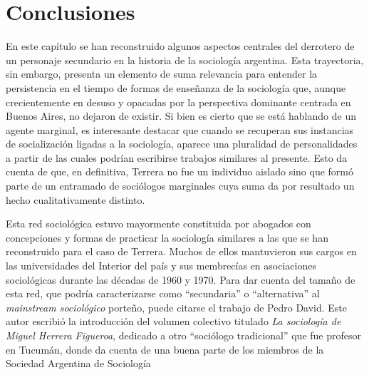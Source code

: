\section{Conclusiones}

En este capítulo se han reconstruido algunos aspectos centrales del derrotero de un personaje secundario en la historia de la sociología argentina. Esta trayectoria, sin embargo, presenta un elemento de suma relevancia para entender la persistencia en el tiempo de formas de enseñanza de la sociología que, aunque crecientemente en desuso y opacadas por la perspectiva dominante centrada en Buenos Aires, no dejaron de existir. Si bien es cierto que se está hablando de un agente marginal, es interesante destacar que cuando se recuperan sus instancias de socialización ligadas a la sociología, aparece una pluralidad de personalidades a partir de las cuales podrían escribirse trabajos similares al presente. Esto da cuenta de que, en definitiva, Terrera no fue un individuo aislado sino que formó parte de un entramado de sociólogos marginales cuya suma da por resultado un hecho cualitativamente distinto.

Esta red sociológica estuvo mayormente constituida por abogados con concepciones y formas de practicar la sociología similares a las que se han reconstruido para el caso de Terrera. Muchos de ellos mantuvieron sus cargos en las universidades del Interior del país y sus membrecías en asociaciones sociológicas durante las décadas de 1960 y 1970. Para dar cuenta del tamaño de esta red, que podría caracterizarse como ``secundaria'' o ``alternativa'' al \emph{mainstream sociológico} porteño, puede citarse el trabajo de Pedro David. Este autor escribió la introducción del volumen colectivo titulado \emph{La sociología de Miguel Herrera Figueroa}, dedicado a otro ``sociólogo tradicional'' que fue profesor en Tucumán, donde da cuenta de una buena parte de los miembros de la Sociedad Argentina de Sociología

